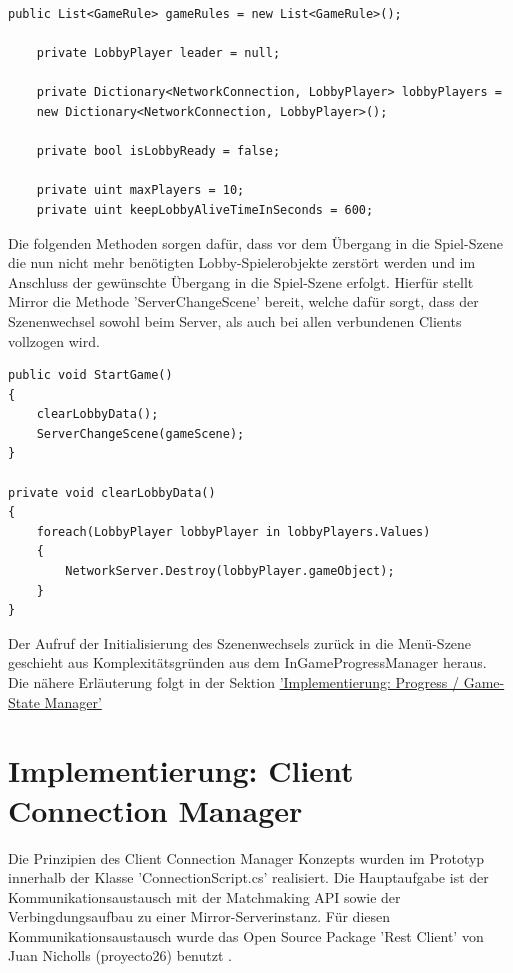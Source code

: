 \newpage

\begin{lstlisting}[caption= GameNetworkManager.cs Lobby Variables]
	public List<GameRule> gameRules = new List<GameRule>();
	
	private LobbyPlayer leader = null;
	
	private Dictionary<NetworkConnection, LobbyPlayer> lobbyPlayers = 
	new Dictionary<NetworkConnection, LobbyPlayer>();
	
	private bool isLobbyReady = false;
	
	private uint maxPlayers = 10;
	private uint keepLobbyAliveTimeInSeconds = 600;
\end{lstlisting}

Die folgenden Methoden sorgen dafür, dass vor dem Übergang in die Spiel-Szene die nun nicht mehr benötigten Lobby-Spielerobjekte zerstört werden und im Anschluss der gewünschte Übergang in die Spiel-Szene erfolgt. Hierfür stellt Mirror die Methode 'ServerChangeScene' bereit, welche dafür sorgt, dass der Szenenwechsel sowohl beim Server, als auch bei allen verbundenen Clients vollzogen wird.

\begin{lstlisting}[caption= GameNetworkManager.cs StartGame]
public void StartGame()
{
	clearLobbyData();
	ServerChangeScene(gameScene);
}

private void clearLobbyData()
{
	foreach(LobbyPlayer lobbyPlayer in lobbyPlayers.Values)
	{
		NetworkServer.Destroy(lobbyPlayer.gameObject);
	}
}
\end{lstlisting}

Der Aufruf der Initialisierung des Szenenwechsels zurück in die Menü-Szene geschieht aus Komplexitätsgründen aus dem InGameProgressManager heraus. Die nähere Erläuterung folgt in der Sektion \hyperref[Progress Manager]{'Implementierung: Progress / Game-State Manager'}

\section{Implementierung: Client Connection Manager}

Die Prinzipien des Client Connection Manager Konzepts wurden im Prototyp innerhalb der Klasse 'ConnectionScript.cs' realisiert. Die Hauptaufgabe ist der Kommunikationsaustausch mit der Matchmaking API sowie der Verbingdungsaufbau zu einer Mirror-Serverinstanz. Für diesen Kommunikationsaustausch wurde das Open Source Package 'Rest Client' von Juan Nicholls (proyecto26) benutzt \cite{GitHub.10.02.2022}.

